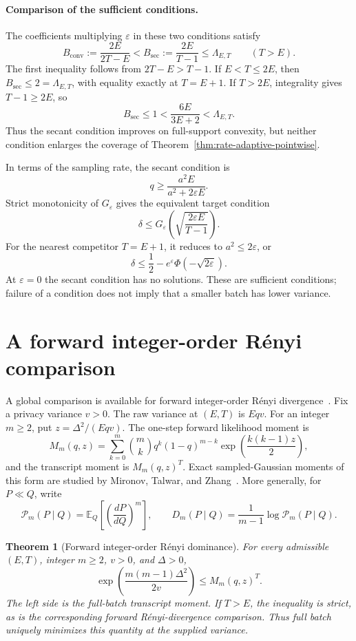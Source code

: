 \documentclass[11pt]{article}
\newtheorem{theorem}{Theorem}[section]
\theoremstyle{remark}
\newcommand{\E}{\mathbb E}
\begin{document}
\paragraph{Comparison of the sufficient conditions.}
The coefficients multiplying $\varepsilon$ in these two conditions satisfy
\[
 B_{\mathrm{conv}}:=\frac{2E}{2T-E}
 <B_{\mathrm{sec}}:=\frac{2E}{T-1}
 \leq\Lambda_{E,T}\qquad(T>E).
\]
The first inequality follows from $2T-E>T-1$. If $E<T\leq2E$, then
$B_{\mathrm{sec}}\leq2=\Lambda_{E,T}$, with equality exactly at $T=E+1$.
If $T>2E$, integrality gives $T-1\geq2E$, so
\[
 B_{\mathrm{sec}}\leq1<\frac{6E}{3E+2}<\Lambda_{E,T}.
\]
Thus the secant condition improves on full-support convexity, but neither
condition enlarges the coverage of Theorem~\ref{thm:rate-adaptive-pointwise}.

In terms of the sampling rate, the secant condition is
\[
 q\geq\frac{a^2E}{a^2+2\varepsilon E}.
\]
Strict monotonicity of $G_\varepsilon$ gives the equivalent target condition
\[
 \delta\leq
 G_\varepsilon\!\left(\sqrt{\frac{2\varepsilon E}{T-1}}\right).
\]
For the nearest competitor $T=E+1$, it reduces to $a^2\leq2\varepsilon$, or
\[
 \delta\leq\frac12-e^\varepsilon\Phi(-\sqrt{2\varepsilon}).
\]
At $\varepsilon=0$ the secant condition has no solutions. These are
sufficient conditions; failure of a condition does not imply that a smaller
batch has lower variance.

\section{A forward integer-order R\'enyi comparison}\label{app:renyi}
A global comparison is available for forward integer-order R\'enyi
divergence~\cite{mironov2017}. Fix a privacy variance $v>0$. The raw variance
at $(E,T)$ is $Eqv$. For an integer $m\geq2$, put
$z=\Delta^2/(Eqv)$. The one-step forward likelihood moment is
\begin{equation}\label{eq:moment}
 M_m(q,z)=\sum_{k=0}^m\binom{m}{k}q^k(1-q)^{m-k}
          \exp\left(\frac{k(k-1)z}{2}\right),
\end{equation}
and the transcript moment is $M_m(q,z)^T$. Exact sampled-Gaussian moments
of this form are studied by Mironov, Talwar, and
Zhang~\cite{mironovtalwarzhang2019}. More generally, for $P\ll Q$, write
\[
 \mathcal P_m(P\mid Q)=\E_Q\left[\left(\frac{dP}{dQ}\right)^m\right],
 \qquad D_m(P\mid Q)=\frac1{m-1}\log\mathcal P_m(P\mid Q).
\]

\begin{theorem}[Forward integer-order R\'enyi dominance]\label{thm:renyi}
For every admissible $(E,T)$, integer $m\geq2$, $v>0$, and $\Delta>0$,
\begin{equation}\label{eq:powerdominance}
 \exp\left(\frac{m(m-1)\Delta^2}{2v}\right)\leq M_m(q,z)^T.
\end{equation}
The left side is the full-batch transcript moment. If $T>E$, the inequality
is strict, as is the corresponding forward R\'enyi-divergence comparison.
Thus full batch uniquely minimizes this quantity at the supplied variance.
\end{theorem}
\end{document}
